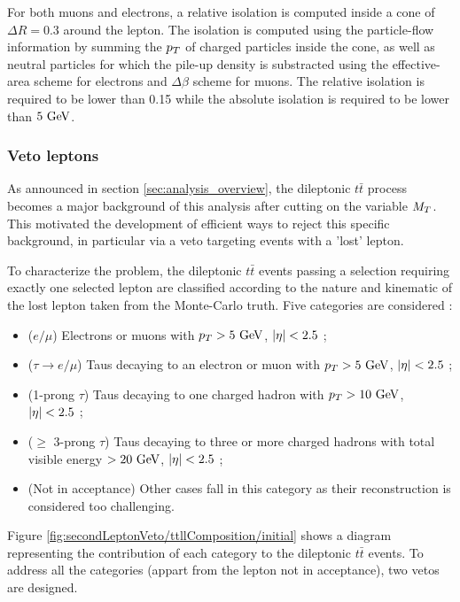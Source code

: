     For both muons and electrons, a relative isolation is computed inside a cone of 
    $\Delta R = 0.3$ around the lepton. The isolation is computed using the particle-flow 
    information by summing the $p_T$ of charged particles inside the cone, as well as 
    neutral particles for which the pile-up density is substracted using the effective-area 
    scheme for electrons and $\Delta \beta$ scheme for muons. The relative isolation is 
    required to be lower than 0.15 while the absolute isolation is required to be lower 
    than $5~\text{GeV}$.

        \subsubsection{Veto leptons \label{sec:vetoLeptons}}

    As announced in section \ref{sec:analysis_overview}, the dileptonic $t\bar{t}$ 
    process becomes a major background of this analysis after cutting on the variable $M_T$.
    This motivated the development of efficient ways to reject this specific background, 
    in particular via a veto targeting events with a 'lost' lepton.

    To characterize the problem, the dileptonic $t\bar{t}$ events passing a selection
    requiring exactly one selected lepton are classified according to the nature and 
    kinematic of the lost lepton taken from the Monte-Carlo truth. Five categories are considered :
    \begin{itemize}
        \item ($e/\mu$) Electrons or muons with $p_T > 5~\text{GeV}$, $\left| \eta \right| < 2.5$ ;
        \item ($\tau \rightarrow e/\mu$) Taus decaying to an electron or muon with $p_T > 5~\text{GeV}$, $\left| \eta \right| < 2.5$ ;
        \item (1-prong $\tau$) Taus decaying to one charged hadron with $p_T > 10~\text{GeV}$, $\left| \eta \right| < 2.5$ ;
        \item ($\geq$ 3-prong $\tau$) Taus decaying to three or more charged hadrons 
              with total visible energy $> 20~\text{GeV}$, $\left| \eta \right| < 2.5$ ;
        \item (Not in acceptance) Other cases fall in this category as their reconstruction 
              is considered too challenging.
    \end{itemize}

    Figure \ref{fig:secondLeptonVeto/ttllComposition/initial} shows a diagram representing 
    the contribution of each category to the dileptonic $t\bar{t}$ events. To address all
    the categories (appart from the lepton not in acceptance), two vetos are designed.

